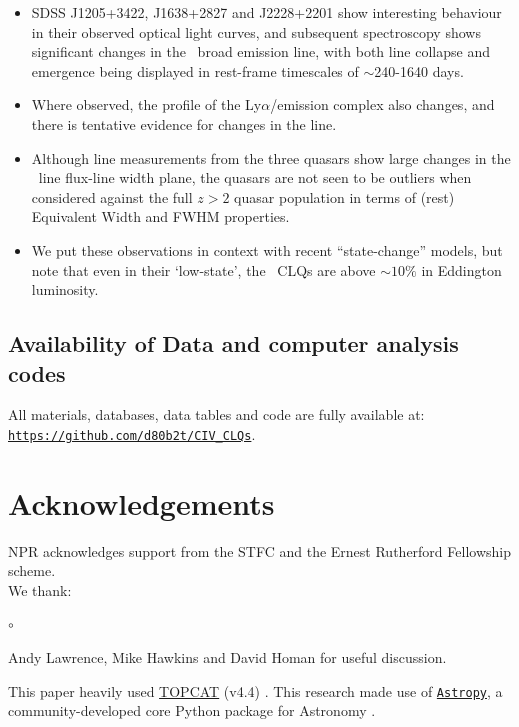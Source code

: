 \documentclass[fleqn,usenatbib]{mnras}
\begin{document}
\begin{itemize}
\item SDSS J1205+3422, J1638+2827 and J2228+2201 show interesting behaviour
  in their observed optical light curves, and subsequent spectroscopy
  shows significant changes in the \civ\ broad emission line, with both
  line collapse and emergence being displayed in rest-frame timescales
  of $\sim$240-1640 days.
\item Where observed, the profile of the Ly$\alpha$/\nv emission complex
  also changes, and there is tentative evidence for changes in the \mgii
  line.
\item Although line measurements from the three quasars show large changes
  in the \civ\ line flux-line width plane, the quasars are not seen to
  be outliers when considered against the full $z>2$ quasar population
  in terms of (rest) Equivalent Width and FWHM properties.
\item 
  We put these observations in context with recent ``state-change''
  models, but note that even in their `low-state', the \civ\ CLQs are
  above $\sim10\%$ in Eddington luminosity.
\end{itemize}




\subsection*{Availability of Data and computer analysis codes} 
All materials, databases, data tables and code are fully available at: 
\href{https://github.com/d80b2t/CIV_CLQs}{\tt https://github.com/d80b2t/CIV\_CLQs}.


\section*{Acknowledgements}
NPR acknowledges support from the STFC and the Ernest Rutherford Fellowship scheme. 
\\

\noindent
We thank:
\begin{list}{$\circ$}{}
  \item Andy Lawrence, Mike Hawkins and David Homan for useful discussion.
\end{list}

This paper heavily used \href{http://www.star.bris.ac.uk/~mbt/topcat/}{TOPCAT} (v4.4)
\citep[][]{Taylor2005, Taylor2011}.
This research made use of \href{http://www.astropy.org}{\tt Astropy}, 
a community-developed core Python package for Astronomy 
\citep{AstropyCollaboration2013, AstropyCollaboration2018}.
\end{document}
